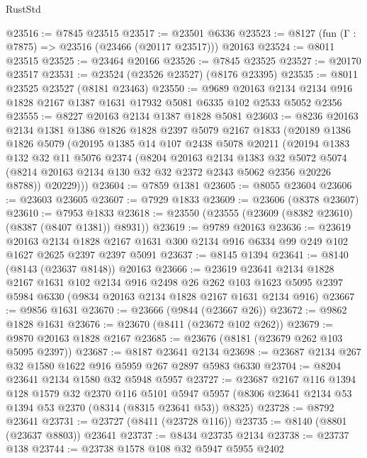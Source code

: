 \begin{lexlean}{RustStd}
\begin{coremodule}
@23516 := @7845 @23515
@23517 := @23501 @6336
@23523 := @8127 (fun (Γ : @7875) => @23516 (@23466 (@20117 @23517))) @20163
@23524 := @8011 @23515
@23525 := @23464 @20166
@23526 := @7845 @23525
@23527 := @20170 @23517
@23531 := @23524 (@23526 @23527) (@8176 @23395)
@23535 := @8011 @23525 @23527 (@8181 @23463)
@23550 := @9689
    @20163
    @2134
    @2134
    @916
    @1828
    @2167
    @1387
    @1631
    @17932
    @5081
    @6335
    @102
    @2533
    @5052
    @2356
@23555 := @8227 @20163 @2134 @1387 @1828 @5081
@23603 := @8236
    @20163
    @2134
    @1381
    @1386
    @1826
    @1828
    @2397
    @5079
    @2167
    @1833
    (@20189
      @1386
      @1826
      @5079
      (@20195
        @1385
        @14
        @107
        @2438
        @5078
        @20211
        (@20194
          @1383
          @132
          @32
          @11
          @5076
          @2374
          (@8204
            @20163
            @2134
            @1383
            @32
            @5072
            @5074
            (@8214 @20163 @2134 @130 @32 @32 @2372 @2343 @5062 @2356 @20226 @8788))
          @20229)))
@23604 := @7859 @1381
@23605 := @8055 @23604
@23606 := @23603 @23605
@23607 := @7929 @1833
@23609 := @23606 (@8378 @23607)
@23610 := @7953 @1833
@23618 := @23550 (@23555 (@23609 (@8382 @23610) (@8387 (@8407 @1381)) @8931))
@23619 := @9789 @20163
@23636 := @23619
    @20163
    @2134
    @1828
    @2167
    @1631
    @300
    @2134
    @916
    @6334
    @99
    @249
    @102
    @1627
    @2625
    @2397
    @2397
    @5091
@23637 := @8145 @1394
@23641 := @8140 (@8143 (@23637 @8148)) @20163
@23666 := @23619
    @23641
    @2134
    @1828
    @2167
    @1631
    @102
    @2134
    @916
    @2498
    @26
    @262
    @103
    @1623
    @5095
    @2397
    @5984
    @6330
    (@9834 @20163 @2134 @1828 @2167 @1631 @2134 @916)
@23667 := @9856 @1631
@23670 := @23666 (@9844 (@23667 @26))
@23672 := @9862 @1828 @1631
@23676 := @23670 (@8411 (@23672 @102 @262))
@23679 := @9870 @20163 @1828 @2167
@23685 := @23676 (@8181 (@23679 @262 @103 @5095 @2397))
@23687 := @8187 @23641 @2134
@23698 := @23687 @2134 @267 @32 @1580 @1622 @916 @5959 @267 @2897 @5983 @6330
@23704 := @8204 @23641 @2134 @1580 @32 @5948 @5957
@23727 := @23687
    @2167
    @116
    @1394
    @128
    @1579
    @32
    @2370
    @116
    @5101
    @5947
    @5957
    (@8306 @23641 @2134 @53 @1394 @53 @2370 (@8314 (@8315 @23641 @53)) @8325)
@23728 := @8792 @23641
@23731 := @23727 (@8411 (@23728 @116))
@23735 := @8140 (@8801 (@23637 @8803)) @23641
@23737 := @8434 @23735 @2134
@23738 := @23737 @138
@23744 := @23738 @1578 @108 @32 @5947 @5955 @2402

\end{coremodule}
\end{lexlean}
